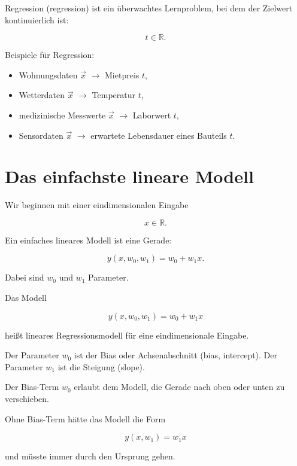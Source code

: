 \begin{definitionbox}
Regression (regression) ist ein überwachtes Lernproblem, bei dem der Zielwert kontinuierlich ist:

\[
    t \in \mathbb{R}.
\]
\end{definitionbox}

\begin{examplebox}
Beispiele für Regression:

\begin{itemize}
    \item Wohnungsdaten \(\vec{x}\) \(\rightarrow\) Mietpreis \(t\),
    \item Wetterdaten \(\vec{x}\) \(\rightarrow\) Temperatur \(t\),
    \item medizinische Messwerte \(\vec{x}\) \(\rightarrow\) Laborwert \(t\),
    \item Sensordaten \(\vec{x}\) \(\rightarrow\) erwartete Lebensdauer eines Bauteils \(t\).
\end{itemize}
\end{examplebox}

\section{Das einfachste lineare Modell}

Wir beginnen mit einer eindimensionalen Eingabe

\[
    x \in \mathbb{R}.
\]

Ein einfaches lineares Modell ist eine Gerade:

\[
    y(x,w_0,w_1)
    =
    w_0 + w_1x.
\]

Dabei sind \(w_0\) und \(w_1\) Parameter.

\begin{definitionbox}
Das Modell

\[
    y(x,w_0,w_1)
    =
    w_0 + w_1x
\]

heißt lineares Regressionsmodell für eine eindimensionale Eingabe.

Der Parameter \(w_0\) ist der Bias oder Achsenabschnitt (bias, intercept).
Der Parameter \(w_1\) ist die Steigung (slope).
\end{definitionbox}

\begin{conceptbox}
Der Bias-Term \(w_0\) erlaubt dem Modell, die Gerade nach oben oder unten zu verschieben.

Ohne Bias-Term hätte das Modell die Form

\[
    y(x,w_1)
    =
    w_1x
\]

und müsste immer durch den Ursprung gehen.
\end{conceptbox}

